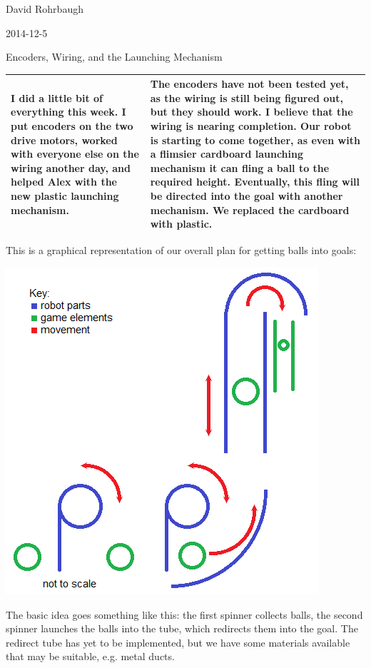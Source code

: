 David Rohrbaugh

2014-12-5

Encoders, Wiring, and the Launching Mechanism

\begin{tabular}{|p{5cm}|p{5cm}|}
 \hline
 I did a little bit of everything this week. I put encoders on the two drive motors, worked with everyone else on the wiring another day, and helped Alex with the new plastic launching mechanism.
 &
 The encoders have not been tested yet, as the wiring is still being figured out, but they should work. I believe that the wiring is nearing completion. Our robot is starting to come together, as even with a flimsier cardboard launching mechanism it can fling a ball to the required height. Eventually, this fling will be directed into the goal with another mechanism. We replaced the cardboard with plastic.
 \\
 \hline
\end{tabular}

\medskip

This is a graphical representation of our overall plan for getting balls into goals:

\begin{center}
 \includegraphics{./Entries/Images/scoring_design.png}
\end{center}

The basic idea goes something like this: the first spinner collects balls, the second spinner launches the balls into the tube, which redirects them into the goal.
The redirect tube has yet to be implemented, but we have some materials available that may be suitable, e.g. metal ducts.
